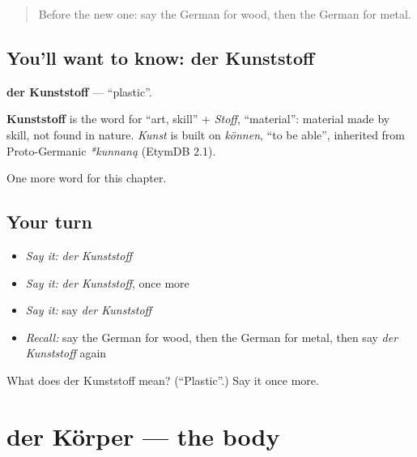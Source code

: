 \label{lesson:GE-C204-kunststoff}



\begin{quote}
Before the new one: say the German for wood, then the German for metal.
\end{quote}

\subsection*{You'll want to know: der Kunststoff}
\textbf{der Kunststoff} — \textquotedblleft{}plastic\textquotedblright{}.

\begin{cousinweb}
\textbf{Kunststoff} is the word for \textquotedblleft{}art, skill\textquotedblright{} + \emph{Stoff}, \textquotedblleft{}material\textquotedblright{}: material made by skill, not found in nature. \emph{Kunst} is built on \emph{können}, \textquotedblleft{}to be able\textquotedblright{}, inherited from Proto-Germanic \emph{*kunnaną} (EtymDB 2.1).
\end{cousinweb}

\begin{grammarlens}[title={What you've built}]
One more word for this chapter.
\end{grammarlens}

\subsection*{Your turn}
\begin{itemize}
\raggedright
  \item \emph{Say it:} \emph{der Kunststoff}
  \item \emph{Say it:} \emph{der Kunststoff}, once more
  \item \emph{Say it:} say \emph{der Kunststoff}
  \item \emph{Recall:} say the German for wood, then the German for metal, then say \emph{der Kunststoff} again
\end{itemize}

\begin{tcolorbox}[breakable,colback=teal!4,colframe=teal!35!black,title={Before you move on}]
What does der Kunststoff mean? (\textquotedblleft{}Plastic\textquotedblright{}.) Say it once more.
\end{tcolorbox}
\section[der Körper]{der Körper — the body}

